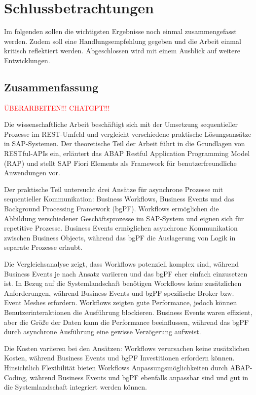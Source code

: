 \chapter{Schlussbetrachtungen}

Im folgenden sollen die wichtigsten Ergebnisse noch einmal zusammengefasst werden. Zudem soll eine Handlungsempfehlung gegeben und die Arbeit einmal kritisch reflektiert werden. Abgeschlossen wird mit einem Ausblick auf weitere Entwicklungen.

\section{Zusammenfassung}

\textcolor{red}{ÜBERARBEITEN!!! CHATGPT!!!}

Die wissenschaftliche Arbeit beschäftigt sich mit der Umsetzung sequentieller Prozesse im REST-Umfeld und vergleicht verschiedene praktische Lösungsansätze in SAP-Systemen. Der theoretische Teil der Arbeit führt in die Grundlagen von RESTful-APIs ein, erläutert das ABAP Restful Application Programming Model (RAP) und stellt SAP Fiori Elements als Framework für benutzerfreundliche Anwendungen vor.

Der praktische Teil untersucht drei Ansätze für asynchrone Prozesse mit sequentieller Kommunikation: Business Workflows, Business Events und das Background Processing Framework (bgPF). Workflows ermöglichen die Abbildung verschiedener Geschäftsprozesse im SAP-System und eignen sich für repetitive Prozesse. Business Events ermöglichen asynchrone Kommunikation zwischen Business Objects, während das bgPF die Auslagerung von Logik in separate Prozesse erlaubt.

Die Vergleichsanalyse zeigt, dass Workflows potenziell komplex sind, während Business Events je nach Ansatz variieren und das bgPF eher einfach einzusetzen ist. In Bezug auf die Systemlandschaft benötigen Workflows keine zusätzlichen Anforderungen, während Business Events und bgPF spezifische Broker bzw. Event Meshes erfordern. Workflows zeigten gute Performance, jedoch können Benutzerinteraktionen die Ausführung blockieren. Business Events waren effizient, aber die Grö{\ss}e der Daten kann die Performance beeinflussen, während das bgPF durch asynchrone Ausführung eine gewisse Verzögerung aufweist.

Die Kosten variieren bei den Ansätzen: Workflows verursachen keine zusätzlichen Kosten, während Business Events und bgPF Investitionen erfordern können. Hinsichtlich Flexibilität bieten Workflows Anpassungsmöglichkeiten durch ABAP-Coding, während Business Events und bgPF ebenfalls anpassbar sind und gut in die Systemlandschaft integriert werden können.

